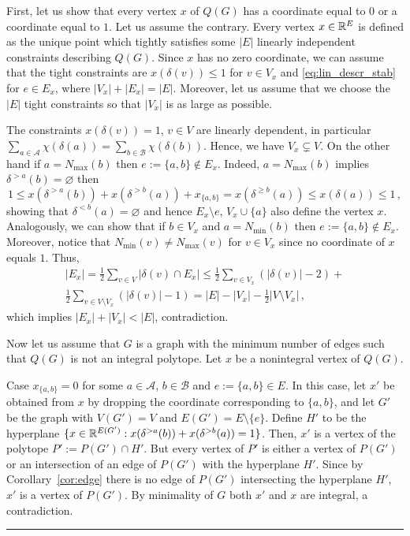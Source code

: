 \documentclass[preprint]{elsarticle}
\newenvironment{proof}{{\bf Proof:  }}{\hfill\rule{2mm}{2mm}}
\begin{document}
\begin{proof}
First, let us show that every vertex $x$ of $Q(G)$ has a coordinate equal to $0$ or a coordinate equal to $1$. Let us assume the contrary. Every vertex $x\in \mathbb{R}^E$ is defined as the unique point which tightly satisfies some $|E|$ linearly independent constraints describing $Q(G)$. Since $x$ has no zero coordinate, we can assume  that the tight constraints are $x(\delta(v))\le 1$ for $v\in V_x$ and \eqref{eq:lin_descr_stab} for $e\in E_x$, where $|V_x|+|E_x|=|E|$. Moreover, let us assume that we choose the $|E|$ tight constraints so that $|V_x|$ is as large as possible. 

The constraints $x(\delta(v))=1$, $v\in V$ are linearly dependent, in particular $\sum_{a\in\mathcal{A}}\chi(\delta(a))=\sum_{b\in\mathcal{B}}\chi(\delta(b))$. Hence, we have $V_x\subsetneq V$. On the other hand if $a=N_{\max}(b)$ then $e:=\{a,b\}\not\in E_x$. Indeed, $a=N_{\max}(b)$ implies $\delta^{>a}(b)=\varnothing$ then
$$
	1\le x(\delta^{>a}(b))+ x(\delta^{>b}(a)) + x_{\{a,b\}}=x(\delta^{\ge b}(a)) \le x(\delta(a)) \le 1\,,
$$
showing that $\delta^{< b}(a)=\varnothing$ and hence $E_x\setminus e$, $V_x\cup \{a\}$ also define the vertex $x$. Analogously, we can show that if $b\in V_x$  and $a=N_{\min}(b)$ then $e:=\{a,b\}\not\in E_x$. Moreover, notice that $N_{\min}(v)\neq N_{\max}(v)$ for $v\in V_x$ since no coordinate of $x$ equals $1$. Thus, 
\begin{multline*}
	|E_x|=\frac{1}{2}\sum_{v\in V} |\delta(v)\cap E_x|\le \frac{1}{2}\sum_{v\in V_x} (|\delta(v)|-2)+\\\frac{1}{2}\sum_{v\in V\setminus V_x} (|\delta(v)|-1)= |E|-|V_x|-\frac{1}{2}|V\setminus V_x|\,,
\end{multline*}
which implies $|E_x|+|V_x|< |E|$, contradiction.

\bigskip

Now let us assume that $G$ is a graph with the minimum number of edges such that $Q(G)$ is not an integral polytope. Let $x$ be a nonintegral vertex of $Q(G)$.

Case $x_{\{a,b\}}=0$ for some $a\in \mathcal{A}$, $b\in\mathcal{B}$ and $e:=\{a,b\}\in E$. In this case, let $x'$ be obtained from $x$ by dropping the coordinate corresponding to $\{a,b\}$, and let $G'$ be the graph with $V(G')=V$ and $E(G') = E \setminus \{e\}$. Define $H'$ to be the hyperplane $\{x\in \mathbb{R}^{E(G')}: x(\delta^{>a}(b))+ x(\delta^{>b}(a))=1\}$. Then, $x'$ is a vertex of the polytope $P':=P(G')\cap H'$.
But every vertex of $P'$ is either a vertex of $P(G')$ or an intersection of an edge of $P(G')$ with the hyperplane $H'$. Since by Corollary~\ref{cor:edge} there is no edge of $P(G')$ intersecting the hyperplane $H'$, $x'$ is a vertex of $P(G')$. By minimality of $G$ both $x'$ and $x$ are integral, a contradiction.


\end{proof}
\end{document}
